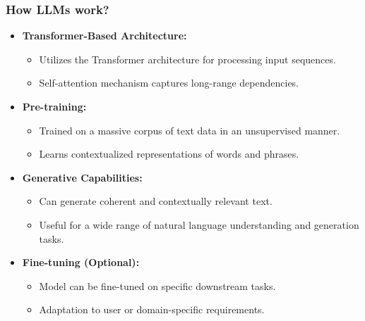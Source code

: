 				


\begin{frame}[fragile]\frametitle{How LLMs work?}

  \begin{itemize}
    \item \textbf{Transformer-Based Architecture:}
      \begin{itemize}
        \item Utilizes the Transformer architecture for processing input sequences.
        \item Self-attention mechanism captures long-range dependencies.
      \end{itemize}

    \item \textbf{Pre-training:} 
      \begin{itemize}
        \item Trained on a massive corpus of text data in an unsupervised manner.
        \item Learns contextualized representations of words and phrases.
      \end{itemize}
	  

    \item \textbf{Generative Capabilities:}
      \begin{itemize}
        \item Can generate coherent and contextually relevant text.
        \item Useful for a wide range of natural language understanding and generation tasks.
      \end{itemize}
	  
    \item \textbf{Fine-tuning (Optional):}
      \begin{itemize}
        \item Model can be fine-tuned on specific downstream tasks.
        \item Adaptation to user or domain-specific requirements.
      \end{itemize}

  \end{itemize}

\end{frame}

